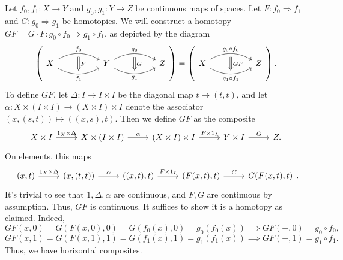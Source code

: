 \begin{construction}\label{const:1-1-7}
	Let $f_0,f_1 : X \to Y$ and $g_0,g_1: Y \to Z$ be continuous maps of spaces. Let $F: f_0 \Rightarrow f_1$ and $G: g_0 \Rightarrow g_1$ be homotopies. We will construct a homotopy $GF=G\cdot F : g_0\circ f_0 \Rightarrow g_1\circ f_1$, as depicted by the diagram
	\[
		\left(\begin{tikzcd}[row sep = 2.5em, column sep = 5em]
			X \ar[" f_0 "{name=f0}, bend left, r] \ar[" f_1 "'{name=f1}, bend right, r]  & Y \ar[" g_0 "{name=g0}, bend left, r] \ar[" g_1 "'{name=g1}, bend right, r]  & Z
			\ar[r, Rightarrow, shorten <= 4pt, shorten >= 4pt, from=f0, to=f1, " F  "] \ar[Rightarrow, shorten <= 4pt, shorten >= 4pt, "G", from=g0, to=g1] 
	\end{tikzcd}\right) = \left( \begin{tikzcd}[row sep = 2.5em, column sep = 5em]
			X \ar[" g_0\circ f_0 "{name=gf0}, bend left, r] \ar[" g_1\circ f_1 "'{name=gf1}, bend right, r]  & Z
			\ar[Rightarrow, shorten <= 4pt, shorten >= 4pt, "GF", from=gf0, to=gf1] 
	\end{tikzcd} \right) .
	\]
	To define $GF$, let $\Delta : I \to I\times I$ be the diagonal map $t\mapsto (t,t)$, and let $\alpha : X\times (I\times I) \to (X\times I)\times I$ denote the associator $(x,(s,t))\mapsto ((x,s),t)$. Then we define $GF$ as the composite
	\[
		\begin{tikzcd}[row sep = 2.5em, column sep = 2.5em]
			X\times I \ar[" 1_X \times \Delta  ", r]  & X\times (I\times I) \ar[" \alpha  ", r]  & (X\times I)\times I \ar[" F\times 1_I ", r]  & Y\times I \ar[" G ", r] & Z.
	\end{tikzcd}
	\]
	On elements, this maps
	\[
		\begin{tikzcd}[row sep = 2.5em, column sep = 2.5em]
			(x,t) \ar[" 1_X\times \Delta  ", r]  & (x,(t,t))\ar[" \alpha  ", r]  & ((x,t),t) \ar[" F\times 1_I ", r]  & (F(x,t),t) \ar[" G ", r]  & G(F(x,t),t)
	\end{tikzcd}.
	\]
	It's trivial to see that $1,\Delta ,\alpha $ are continuous, and $F,G$ are continuous by assumption. Thus, $GF$ is continuous. It suffices to show it is a homotopy as claimed. Indeed,
	\[
		GF(x,0) = G(F(x,0),0) = G(f_0(x),0) = g_0(f_0(x)) \implies GF(-,0) = g_0\circ f_0,
	\]
	\[
		GF(x,1) = G(F(x,1),1) = G(f_1(x),1) = g_1(f_1(x)) \implies GF(-,1) = g_1\circ f_1
	.\]
	Thus, we have horizontal composites.
\end{construction}

